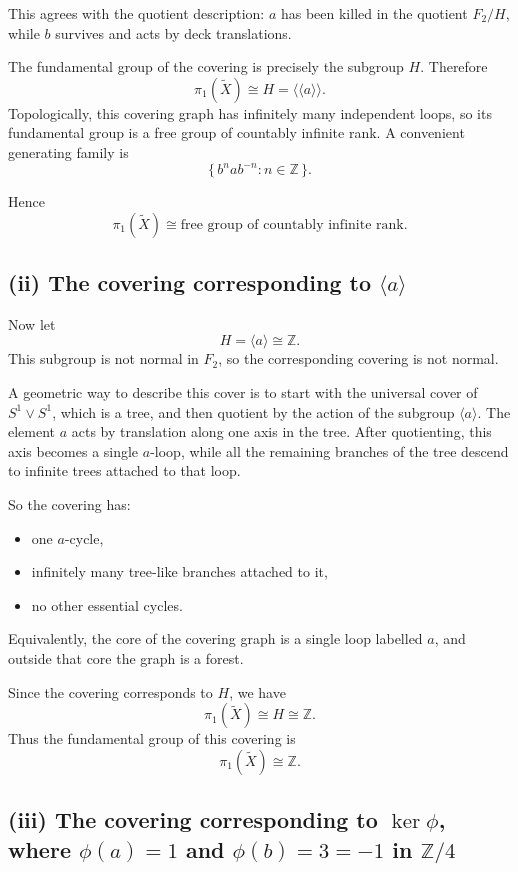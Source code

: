 \documentclass[12pt,a4paper]{article}
\theoremstyle{notespace}
\begin{document}
This agrees with the quotient description: \(a\) has been killed in the quotient \(F_2/H\), while \(b\) survives and acts by deck translations.

The fundamental group of the covering is precisely the subgroup \(H\). Therefore
\[
\pi_1(\widetilde X)\cong H=\langle\!\langle a\rangle\!\rangle.
\]
Topologically, this covering graph has infinitely many independent loops, so its fundamental group is a free group of countably infinite rank. A convenient generating family is
\[
\{\, b^n a b^{-n}: n\in \mathbb Z\,\}.
\]

Hence
\[
\pi_1(\widetilde X)\cong \text{free group of countably infinite rank}.
\]

\subsection*{(ii) The covering corresponding to \texorpdfstring{$\langle a\rangle$}{<a>}}

Now let
\[
H=\langle a\rangle\cong \mathbb Z.
\]
This subgroup is not normal in \(F_2\), so the corresponding covering is not normal.

A geometric way to describe this cover is to start with the universal cover of \(S^1\vee S^1\), which is a tree, and then quotient by the action of the subgroup \(\langle a\rangle\). The element \(a\) acts by translation along one axis in the tree. After quotienting, this axis becomes a single \(a\)-loop, while all the remaining branches of the tree descend to infinite trees attached to that loop.

So the covering has:
\begin{itemize}
	\item one \(a\)-cycle,
	\item infinitely many tree-like branches attached to it,
	\item no other essential cycles.
\end{itemize}

Equivalently, the core of the covering graph is a single loop labelled \(a\), and outside that core the graph is a forest.

Since the covering corresponds to \(H\), we have
\[
\pi_1(\widetilde X)\cong H\cong \mathbb Z.
\]
Thus the fundamental group of this covering is
\[
\pi_1(\widetilde X)\cong \mathbb Z.
\]

\subsection*{(iii) The covering corresponding to \texorpdfstring{$\ker\phi$}{ker phi}, where \texorpdfstring{$\phi(a)=1$}{phi(a)=1} and \texorpdfstring{$\phi(b)=3=-1$}{phi(b)=3=-1} in \texorpdfstring{$\mathbb Z/4$}{Z/4}}
\end{document}
